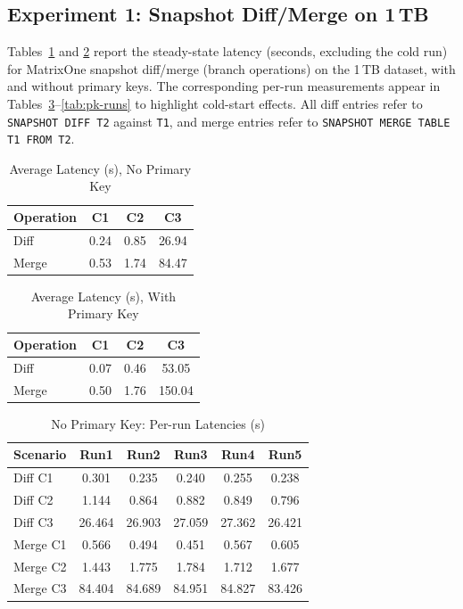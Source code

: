 \documentclass[sigconf,nonacm]{acmart} %
\begin{document}
\subsection{Experiment 1: Snapshot Diff/Merge on 1\,TB}
Tables~\ref{tab:latency-nopk} and \ref{tab:latency-pk} report the
steady-state latency (seconds, excluding the cold run) for MatrixOne
snapshot diff/merge (branch operations) on the 1\,TB dataset, with and
without primary keys.  The corresponding per-run measurements appear in
Tables~\ref{tab:nopk-runs}--\ref{tab:pk-runs} to highlight cold-start
effects.  All diff entries refer to \texttt{SNAPSHOT DIFF T2} against
\texttt{T1}, and merge entries refer to \texttt{SNAPSHOT MERGE TABLE T1
FROM T2}.

\begin{table}[h]
  \centering
  \caption{Average Latency (s), No Primary Key}
  \label{tab:latency-nopk}
  \begin{tabular}{lccc}
    \toprule
    \textbf{Operation} & \textbf{C1} & \textbf{C2} & \textbf{C3} \\
    \midrule
    Diff  & 0.24 & 0.85 & 26.94 \\
    Merge & 0.53 & 1.74 & 84.47 \\
    \bottomrule
  \end{tabular}
\end{table}

\begin{table}[h]
  \centering
  \caption{Average Latency (s), With Primary Key}
  \label{tab:latency-pk}
  \begin{tabular}{lccc}
    \toprule
    \textbf{Operation} & \textbf{C1} & \textbf{C2} & \textbf{C3} \\
    \midrule
    Diff  & 0.07 & 0.46 & 53.05 \\
    Merge & 0.50 & 1.76 & 150.04 \\
    \bottomrule
  \end{tabular}
\end{table}

\begin{table}[h]
  \centering
  \caption{No Primary Key: Per-run Latencies (s)}
  \label{tab:nopk-runs}
  \begin{tabular}{lccccc}
    \toprule
    Scenario & Run1 & Run2 & Run3 & Run4 & Run5 \\
    \midrule
    Diff C1  & 0.301 & 0.235 & 0.240 & 0.255 & 0.238 \\
    Diff C2  & 1.144 & 0.864 & 0.882 & 0.849 & 0.796 \\
    Diff C3  & 26.464 & 26.903 & 27.059 & 27.362 & 26.421 \\
    Merge C1 & 0.566 & 0.494 & 0.451 & 0.567 & 0.605 \\
    Merge C2 & 1.443 & 1.775 & 1.784 & 1.712 & 1.677 \\
    Merge C3 & 84.404 & 84.689 & 84.951 & 84.827 & 83.426 \\
    \bottomrule
  \end{tabular}
\end{table}
\end{document}
